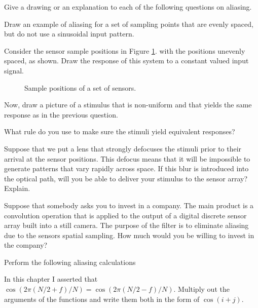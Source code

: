 \item  Give a drawing or an explanation to each of the
following questions on aliasing.

 \be
 \item Draw an example of aliasing for a set of sampling
points that are evenly spaced, but do not use a sinusoidal
input pattern.

 \item Consider the sensor sample positions in Figure \ref{f2:hwSample}.
with the positions unevenly spaced, as shown.
Draw the response of this system to a constant valued input signal.
\begin{figure}
\centerline{
}
\caption[Homework Problem:  Sensor sample positions]{
Sample positions of a set of sensors.
}
\label{f2:hwSample}
\end{figure}

 \item  Now, draw a picture of a stimulus that is non-uniform
and that yields the same response as in the previous question.

 \item  What rule do you use to make sure the
stimuli yield equivalent responses?

 \item  Suppose that we put a lens that strongly
defocuses the stimuli prior to their arrival
at the sensor positions.
This defocus means that it will be impossible to generate
patterns that vary rapidly across space.
If this blur is introduced into
the optical path, will you be able to deliver your stimulus
to the sensor array?
Explain.

 \item Suppose that somebody asks you to invest in a
company.  The main product is a convolution operation
that is applied to the output of a digital discrete sensor array
built into a still camera.
The purpose of the filter is to eliminate aliasing due to
the sensors spatial sampling.
How much would you be willing to invest in the company?

 \ee

\item Perform the following aliasing calculations
\label{q:aliasing}
 \be

 \item In this chapter I asserted that
$\cos (2 \pi ( { N / 2}  + f) / N) = \cos (2 \pi ( { N / 2 } - f ) / N)$.
Multiply out the arguments of the
functions and write them both in the form of $\cos ( i + j )$.


